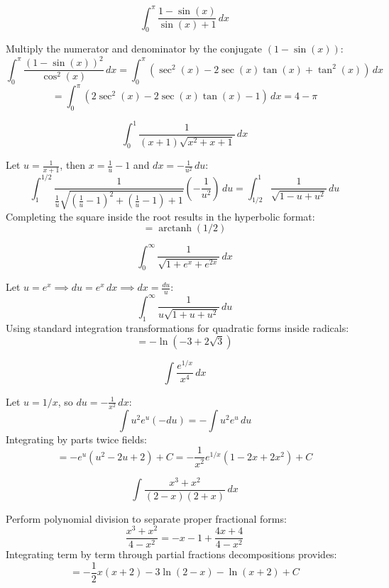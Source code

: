 \begin{questions}
\question
\[ \int_{0}^{\pi} \frac{1-\sin(x)}{\sin(x)+1} \, dx \]
\begin{solution}
Multiply the numerator and denominator by the conjugate $(1-\sin(x))$:
\[ \int_{0}^{\pi} \frac{(1-\sin(x))^2}{\cos^2(x)} \, dx = \int_{0}^{\pi} (\sec^2(x) - 2\sec(x)\tan(x) + \tan^2(x)) \, dx \]
\[ = \int_{0}^{\pi} (2\sec^2(x) - 2\sec(x)\tan(x) - 1) \, dx = 4 - \pi \]
\end{solution}

\question
\[ \int_{0}^{1} \frac{1}{(x+1)\sqrt{x^{2}+x+1}} \, dx \]
\begin{solution}
Let $u = \frac{1}{x+1}$, then $x = \frac{1}{u}-1$ and $dx = -\frac{1}{u^2} \, du$:
\[ \int_{1}^{1/2} \frac{1}{\frac{1}{u}\sqrt{(\frac{1}{u}-1)^2+(\frac{1}{u}-1)+1}} \left(-\frac{1}{u^2}\right) \, du = \int_{1/2}^{1} \frac{1}{\sqrt{1-u+u^2}} \, du \]
Completing the square inside the root results in the hyperbolic format:
\[ = \operatorname{arctanh}(1/2) \]
\end{solution}

\question
\[ \int_{0}^{\infty} \frac{1}{\sqrt{1+e^{x}+e^{2x}}} \, dx \]
\begin{solution}
Let $u = e^x \implies du = e^x \, dx \implies dx = \frac{du}{u}$:
\[ \int_{1}^{\infty} \frac{1}{u\sqrt{1+u+u^2}} \, du \]
Using standard integration transformations for quadratic forms inside radicals:
\[ = -\ln\left(-3+2\sqrt{3}\right) \]
\end{solution}

\question
\[ \int \frac{e^{1/x}}{x^{4}} \, dx \]
\begin{solution}
Let $u = 1/x$, so $du = -\frac{1}{x^2} \, dx$:
\[ \int u^2 e^u (-du) = -\int u^2 e^u \, du \]
Integrating by parts twice fields:
\[ = -e^u(u^2 - 2u + 2) + C = -\frac{1}{x^2}e^{1/x}(1-2x+2x^2) + C \]
\end{solution}

\question
\[ \int \frac{x^{3}+x^{2}}{(2-x)(2+x)} \, dx \]
\begin{solution}
Perform polynomial division to separate proper fractional forms:
\[ \frac{x^3+x^2}{4-x^2} = -x - 1 + \frac{4x+4}{4-x^2} \]
Integrating term by term through partial fractions decompositions provides:
\[ = -\frac{1}{2}x(x+2) - 3\ln(2-x) - \ln(x+2) + C \]
\end{solution}

\end{questions}